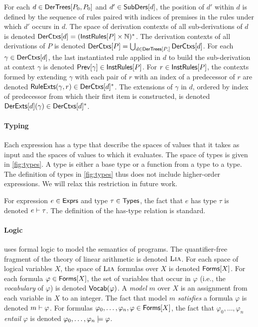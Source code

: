 For each $d \in \mathsf{DerTrees}[ P_0, P_0 ]$ and $d' \in \mathsf{SubDers}[ d ]$, the
position of $d'$ within $d$ is defined by the sequence of rules paired
with indices of premises in the rules under which $d'$ occurs in $d$.
%
The space of derivation contexts of all sub-derivations of $d$ is
denoted $\mathsf{DerCtxs}[ d ] = (\mathsf{InstRules}[ P ] \times \mathbb{N})^{*}$.
%
The derivation contexts of all derivations of $P$ is denoted
$\derctxs{P} = \bigunion_{ d \in \dertrees{P} } \derctxs{ d }$.
%
For each $\gamma \in \mathsf{DerCtxs}[ d ]$, the last instantiated rule applied
in $d$ to build the sub-derivation at context $\gamma$ is denoted
$\mathsf{Prev}[  \gamma  ] \in \mathsf{InstRules}[ P ]$.
%
For $r \in \mathsf{InstRules}[  P  ]$, the contexts formed by extending $\gamma$
with each pair of $r$ with an index of a predecessor of $r$ are
denoted $\mathsf{RuleExts}(\gamma, r) \in \mathsf{DerCtxs}[ d ]^{*}$.
%
The extensions of $\gamma$ in $d$, ordered by index of predecessor
from which their first item is constructed, is denoted $\mathsf{DerExts}[  d
 ](\gamma) \in \mathsf{DerCtxs}[  d  ]^{*}$.

\paragraph{Typing}
%
Each expression has a type that describe the spaces of values that it
takes as input and the spaces of values to which it evaluates.
%
The space of types is given in \autoref{fig:types}.
%
A type is either a base type or a function from a type to a type.
%
The definition of types in \autoref{fig:types} thus does not include
higher-order expressions.
%
We will relax this restriction in future work.
%

For expression $e \in \mathsf{Exprs}$ and type $\tau \in \mathsf{Types}$, the fact that
$e$ has type $\tau$ is denoted $e \vdash \tau$.
%
The definition of the has-type relation is standard.

\paragraph{Logic}
%
\sys uses formal logic to model the semantics of programs.
%
The quantifier-free fragment of the theory of linear arithmetic is
denoted $\textsc{Lia}$.
%
For each space of logical variables $X$, the space of $\textsc{Lia}$ formulas
over $X$ is denoted $\mathsf{Forms}[ X ]$.
%
For each formula $\varphi \in \mathsf{Forms}[ X ]$, the set of variables that
occur in $\varphi$ (i.e., the \emph{vocabulary} of $\varphi$) is
denoted $\mathsf{Vocab}(\varphi)$.
A \lia \emph{model} $m$ over $X$ is an assignment from each variable
in $X$ to an integer.
%
The fact that model $m$ \emph{satisfies} a formula $\varphi$ is
denoted $m \vdash \varphi$.
%
For formulas $\varphi_0, \ldots, \varphi_n, \varphi \in \mathsf{Forms}[ X ]$,
the fact that $\varphi_0, \ldots, \varphi_n$ \emph{entail} $\varphi$
is denoted $\varphi_0, \ldots, \varphi_n \models \varphi$.


